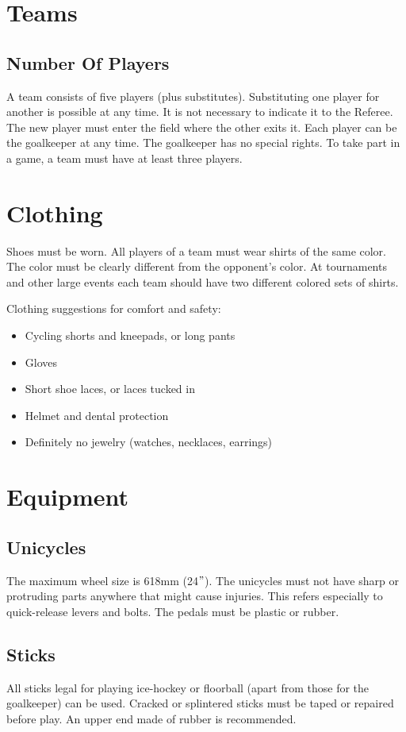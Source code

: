 \section{Teams}

\subsection{Number Of Players}
A team consists of five players (plus substitutes).
Substituting one player for another is possible at any time.
It is not necessary to indicate it to the Referee.
The new player must enter the field where the other exits it.
Each player can be the goalkeeper at any time.
The goalkeeper has no special rights.
To take part in a game, a team must have at least three players.

\section{Clothing}
Shoes must be worn.
All players of a team must wear shirts of the same color.
The color must be clearly different from the opponent's color.
At tournaments and other large events each team should have two different colored sets of shirts.

Clothing suggestions for comfort and safety:
\begin{itemize}
\item Cycling shorts and kneepads, or long pants
\item Gloves
\item Short shoe laces, or laces tucked in
\item Helmet and dental protection
\item Definitely no jewelry (watches, necklaces, earrings)
\end{itemize}

\section{Equipment}

\subsection{Unicycles}
The maximum wheel size is 618mm (24$"$).
The unicycles must not have sharp or protruding parts anywhere that might cause injuries.
This refers especially to quick-release levers and bolts.
The pedals must be plastic or rubber.

\subsection{Sticks}
All sticks legal for playing ice-hockey or floorball (apart from those for the goalkeeper) can be used.
Cracked or splintered sticks must be taped or repaired before play.
An upper end made of rubber is recommended.

